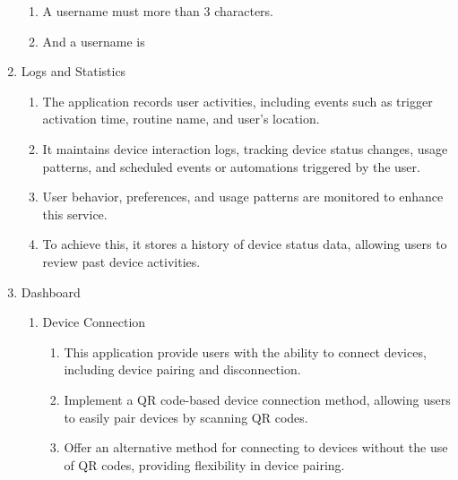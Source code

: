 \begin{enumerate}[label=\arabic*.]
\begin{enumerate}[label*={\arabic*.},ref=\theenumi.\arabic*]
        \item A username must more than 3 characters.\\

        \item And a username is 
    \end{enumerate}

    \item {\large{Logs and Statistics}}\\
    \begin{enumerate}[label*={\arabic*.},ref=\theenumi.\arabic*]
    \setlength{\itemindent}{0.5cm}
        \item The application records user activities, including events such as trigger activation time, routine name, and user's location. \\
        
        \item It maintains device interaction logs, tracking device status changes, usage patterns, and scheduled events or automations triggered by the user. \\
        
        
        \item User behavior, preferences, and usage patterns are monitored to enhance this service. \\
        
        \item To achieve this, it stores a history of device status data, allowing users to review past device activities.\\
    \end{enumerate}


    \item {\large{Dashboard}}\\
    \begin{enumerate}[label*={\arabic*.}]
        \item {\large{Device Connection}}\\
            \begin{enumerate}[label*={\arabic*.},ref=\theenumi.\arabic*]
            \setlength{\itemindent}{0.5cm}
            \item This application provide users with the ability to connect devices, including device pairing and disconnection.\\
            \item Implement a QR code-based device connection method, allowing users to easily pair devices by scanning QR codes.\\
            \item Offer an alternative method for connecting to devices without the use of QR codes, providing flexibility in device pairing.\\
        \end{enumerate}
        

\end{enumerate}
\end{enumerate}
